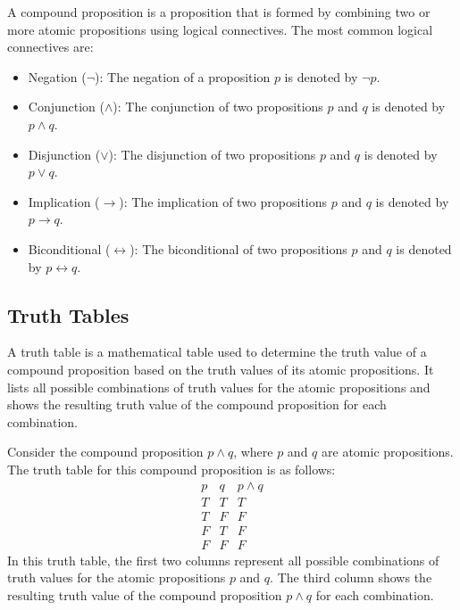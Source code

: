 \begin{definition}
    A compound proposition is a proposition that is formed by combining two or more atomic propositions using logical connectives.
    The most common logical connectives are:
    \begin{itemize}[itemsep=1pt,label=$\circ$]
        \item Negation ($\neg$): The negation of a proposition $p$ is denoted by $\neg p$.
        \item Conjunction ($\land$): The conjunction of two propositions $p$ and $q$ is denoted by $p \land q$.
        \item Disjunction ($\lor$): The disjunction of two propositions $p$ and $q$ is denoted by $p \lor q$.
        \item Implication ($\to$): The implication of two propositions $p$ and $q$ is denoted by $p \to q$.
        \item Biconditional ($\leftrightarrow$): The biconditional of two propositions $p$ and $q$ is denoted by $p \leftrightarrow q$.
    \end{itemize}
\end{definition}

\subsection{Truth Tables}
\begin{definition}
    A truth table is a mathematical table used to determine the truth value of a compound proposition based on the truth values of its atomic propositions. It lists all possible combinations of truth values for the atomic propositions and shows the resulting truth value of the compound proposition for each combination.
\end{definition}

\begin{eg}
    Consider the compound proposition \(p \land q\), where \(p\) and \(q\) are atomic propositions. The truth table for this compound proposition is as follows:
    \[
        \begin{array}{c|c|c}
            p & q & p \land q \\
            \hline
            T & T & T \\
            T & F & F \\
            F & T & F \\
            F & F & F
        \end{array}
    \]
    In this truth table, the first two columns represent all possible combinations of truth values for the atomic propositions \(p\) and \(q\). The third column shows the resulting truth value of the compound proposition \(p \land q\) for each combination.
\end{eg}

